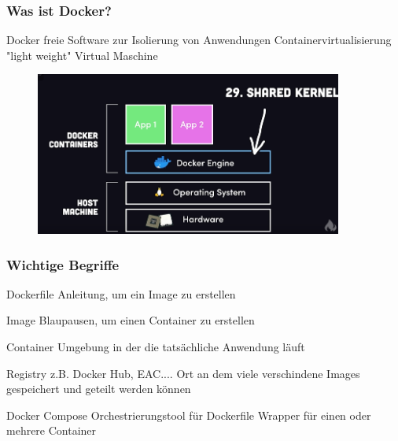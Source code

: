\documentclass[22pt]{beamer}
\begin{document}
\begin{frame}[t]
    \frametitle{Was ist Docker?}
    \begin{block}{Docker}
        freie Software zur Isolierung von Anwendungen\newline
        Containervirtualisierung\newline
        "light weight" Virtual Maschine\newline
    \end{block}
    \begin{figure}[h]
        \centering
        \includegraphics[width=0.9\textwidth]{Bilder/Docker Concept.png}
    \end{figure}
\end{frame}


\begin{frame}[t]
    \frametitle{Wichtige Begriffe}
    \begin{block}{Dockerfile}
        Anleitung, um ein Image zu erstellen
    \end{block}
    \begin{block}{Image}
        Blaupausen, um einen Container zu erstellen
    \end{block}
    \begin{block}{Container}
        Umgebung in der die tatsächliche Anwendung läuft
    \end{block} \pause
    \begin{block}{Registry}
        z.B. Docker Hub, EAC....
        Ort an dem viele verschindene Images gespeichert und geteilt werden können
    \end{block}
    \begin{block}{Docker Compose}
        Orchestrierungstool für Dockerfile\newline
        Wrapper für einen oder mehrere Container
    \end{block}
\end{frame}
\end{document}
